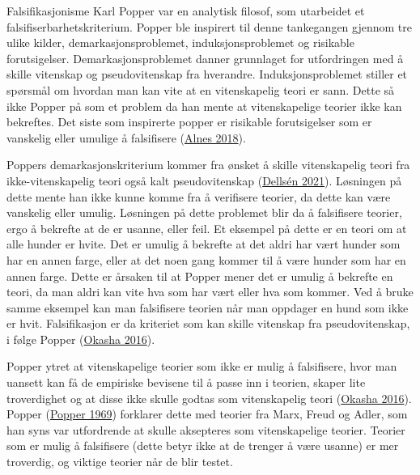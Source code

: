 \documentclass[
]{book}
\begin{document}
Falsifikasjonisme Karl Popper var en analytisk filosof, som utarbeidet
et falsifiserbarhetskriterium. Popper ble inspirert til denne
tankegangen gjennom tre ulike kilder, demarkasjonsproblemet,
induksjonsproblemet og risikable forutsigelser. Demarkasjonsproblemet
danner grunnlaget for utfordringen med å skille vitenskap og
pseudovitenskap fra hverandre. Induksjonsproblemet stiller et spørsmål
om hvordan man kan vite at en vitenskapelig teori er sann. Dette så ikke
Popper på som et problem da han mente at vitenskapelige teorier ikke kan
bekreftes. Det siste som inspirerte popper er risikable forutsigelser
som er vanskelig eller umulige å falsifisere
(\protect\hyperlink{ref-alnes2018}{Alnes 2018}).

Poppers demarkasjonskriterium kommer fra ønsket å skille vitenskapelig
teori fra ikke-vitenskapelig teori også kalt pseudovitenskap
(\protect\hyperlink{ref-dellsuxe9n2021}{Dellsén 2021}). Løsningen på
dette mente han ikke kunne komme fra å verifisere teorier, da dette kan
være vanskelig eller umulig. Løsningen på dette problemet blir da å
falsifisere teorier, ergo å bekrefte at de er usanne, eller feil. Et
eksempel på dette er en teori om at alle hunder er hvite. Det er umulig
å bekrefte at det aldri har vært hunder som har en annen farge, eller at
det noen gang kommer til å være hunder som har en annen farge. Dette er
årsaken til at Popper mener det er umulig å bekrefte en teori, da man
aldri kan vite hva som har vært eller hva som kommer. Ved å bruke samme
eksempel kan man falsifisere teorien når man oppdager en hund som ikke
er hvit. Falsifikasjon er da kriteriet som kan skille vitenskap fra
pseudovitenskap, i følge Popper
(\protect\hyperlink{ref-okasha2016}{Okasha 2016}).

Popper ytret at vitenskapelige teorier som ikke er mulig å falsifisere,
hvor man uansett kan få de empiriske bevisene til å passe inn i teorien,
skaper lite troverdighet og at disse ikke skulle godtas som
vitenskapelig teori (\protect\hyperlink{ref-okasha2016}{Okasha 2016}).
Popper (\protect\hyperlink{ref-popper1969}{Popper 1969}) forklarer dette
med teorier fra Marx, Freud og Adler, som han syns var utfordrende at
skulle aksepteres som vitenskapelige teorier. Teorier som er mulig å
falsifisere (dette betyr ikke at de trenger å være usanne) er mer
troverdig, og viktige teorier når de blir testet.
\end{document}
